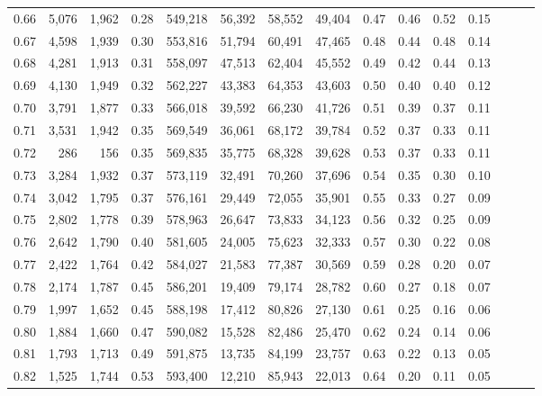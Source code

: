 \begin{tabular}{rrrrrrrrrrrrrrr}
0.66 &   5,076 &  1,962 &  0.28 &  549,218 &   56,392 &   58,552 &   49,404 &  0.47 &  0.46 &  0.52 &      0.15 \\
0.67 &   4,598 &  1,939 &  0.30 &  553,816 &   51,794 &   60,491 &   47,465 &  0.48 &  0.44 &  0.48 &      0.14 \\
0.68 &   4,281 &  1,913 &  0.31 &  558,097 &   47,513 &   62,404 &   45,552 &  0.49 &  0.42 &  0.44 &      0.13 \\
0.69 &   4,130 &  1,949 &  0.32 &  562,227 &   43,383 &   64,353 &   43,603 &  0.50 &  0.40 &  0.40 &      0.12 \\
0.70 &   3,791 &  1,877 &  0.33 &  566,018 &   39,592 &   66,230 &   41,726 &  0.51 &  0.39 &  0.37 &      0.11 \\
0.71 &   3,531 &  1,942 &  0.35 &  569,549 &   36,061 &   68,172 &   39,784 &  0.52 &  0.37 &  0.33 &      0.11 \\
0.72 &     286 &    156 &  0.35 &  569,835 &   35,775 &   68,328 &   39,628 &  0.53 &  0.37 &  0.33 &      0.11 \\
0.73 &   3,284 &  1,932 &  0.37 &  573,119 &   32,491 &   70,260 &   37,696 &  0.54 &  0.35 &  0.30 &      0.10 \\
0.74 &   3,042 &  1,795 &  0.37 &  576,161 &   29,449 &   72,055 &   35,901 &  0.55 &  0.33 &  0.27 &      0.09 \\
0.75 &   2,802 &  1,778 &  0.39 &  578,963 &   26,647 &   73,833 &   34,123 &  0.56 &  0.32 &  0.25 &      0.09 \\
0.76 &   2,642 &  1,790 &  0.40 &  581,605 &   24,005 &   75,623 &   32,333 &  0.57 &  0.30 &  0.22 &      0.08 \\
0.77 &   2,422 &  1,764 &  0.42 &  584,027 &   21,583 &   77,387 &   30,569 &  0.59 &  0.28 &  0.20 &      0.07 \\
0.78 &   2,174 &  1,787 &  0.45 &  586,201 &   19,409 &   79,174 &   28,782 &  0.60 &  0.27 &  0.18 &      0.07 \\
0.79 &   1,997 &  1,652 &  0.45 &  588,198 &   17,412 &   80,826 &   27,130 &  0.61 &  0.25 &  0.16 &      0.06 \\
0.80 &   1,884 &  1,660 &  0.47 &  590,082 &   15,528 &   82,486 &   25,470 &  0.62 &  0.24 &  0.14 &      0.06 \\
0.81 &   1,793 &  1,713 &  0.49 &  591,875 &   13,735 &   84,199 &   23,757 &  0.63 &  0.22 &  0.13 &      0.05 \\
0.82 &   1,525 &  1,744 &  0.53 &  593,400 &   12,210 &   85,943 &   22,013 &  0.64 &  0.20 &  0.11 &      0.05 \\

\end{tabular}

